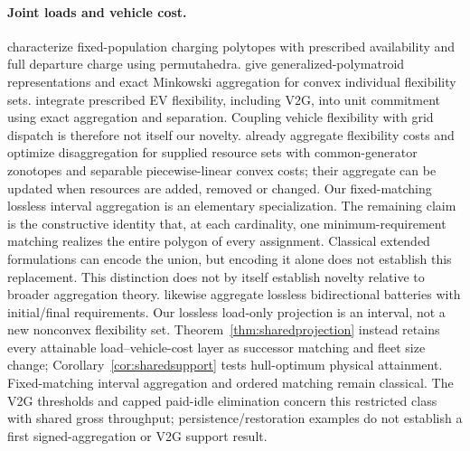 \paragraph{Joint loads and vehicle cost.}
\citet{mukhiAbate2023exact} characterize fixed-population charging polytopes
with prescribed availability and full departure charge using permutahedra.
\citet{mukhiLohoAbate2025exact} give generalized-polymatroid representations
and exact Minkowski aggregation for convex individual flexibility sets.
\citet{arvis2026aggregated} integrate prescribed EV flexibility, including
V2G, into unit commitment using exact aggregation and separation. Coupling
vehicle flexibility with grid dispatch is therefore not itself our novelty.
\citet[author version, Sections IV--V, equations~(12)--(17)]{muller2019aggregation}
already aggregate flexibility costs and optimize disaggregation for supplied
resource sets with common-generator zonotopes and separable piecewise-linear
convex costs; their aggregate can be updated when resources are added, removed
or changed. Our fixed-matching lossless interval aggregation is an elementary
specialization. The remaining claim is the constructive identity that, at each
cardinality, one minimum-requirement matching realizes the entire polygon of
every assignment. Classical extended formulations can encode the union, but
encoding it alone does not establish this replacement. This distinction does
not by itself establish novelty relative to broader aggregation theory.
\citet[Section II, Example 1]{altaha2024flexibility} likewise aggregate
lossless bidirectional batteries with initial/final requirements.
Our lossless load-only projection is an interval, not a new nonconvex
flexibility set. Theorem~\ref{thm:sharedprojection} instead retains every attainable
load--vehicle-cost layer as successor matching and fleet size change;
Corollary~\ref{cor:sharedsupport} tests hull-optimum physical attainment.
Fixed-matching interval aggregation and ordered matching remain classical.
The V2G thresholds and capped paid-idle elimination concern this restricted
class with shared gross throughput; persistence/restoration examples do
not establish a first signed-aggregation or V2G support result.

